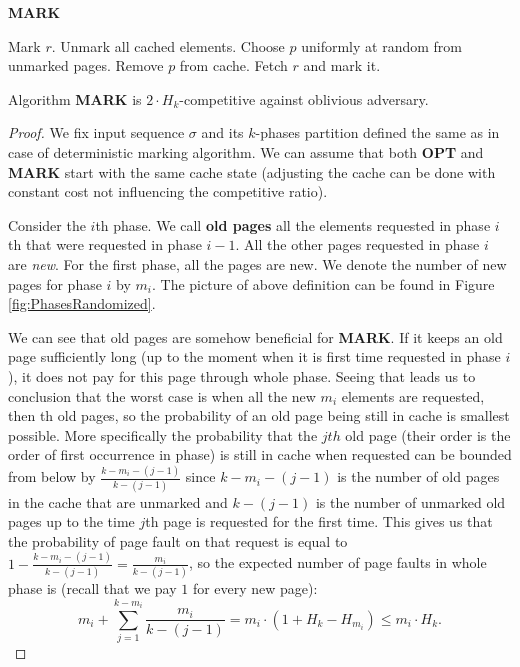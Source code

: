 \begin{algorithm}
\caption{\textbf{MARK}}
\label{alg:MARK}
\begin{algorithmic}[1]
    \State Mark $r$.
  \Else
	\State Unmark all cached elements.
      \EndIf
      \State Choose $p$ uniformly at random from unmarked pages.
      \State Remove $p$ from cache.
    \EndIf
    \State Fetch $r$ and mark it.
  \EndIf
\EndFor
\end{algorithmic}
\end{algorithm}
\begin{theorem}
 Algorithm \textbf{MARK} is $2 \cdot H_k$-competitive against oblivious 
adversary.
\end{theorem}
\begin{proof}
We fix input sequence $\sigma$ and its $k$-phases partition defined the same as 
in case of deterministic marking algorithm. We can assume that both 
\textbf{OPT} and \textbf{MARK} start with the same cache state (adjusting the 
cache can be done with constant cost not influencing the competitive ratio).

Consider the $i$th phase. We call \textbf{old pages} all the elements requested 
in 
phase $i$th that were requested in phase $i-1$. All the other pages requested 
in phase $i$ are \textit{new}. For the first phase, all the pages are new. We 
denote the number of new pages for phase $i$ by $m_i$. The picture of above 
definition can be found in Figure \ref{fig:PhasesRandomized}.


We can see that old pages are somehow beneficial for \textbf{MARK}. If it keeps 
an old page sufficiently long (up to the moment when it is first time requested 
in phase $i$), it does not pay for this page through whole phase. Seeing that 
leads us to conclusion that the worst case is when all the new 
$m_i$ elements are requested, then th old pages, so the probability of an old 
page being still in cache is smallest possible. More specifically the 
probability that the $jth$ old page (their order is the order of first 
occurrence 
in phase) is still in cache when requested can be bounded from below by 
$\frac{k-m_i-(j-1)}{k-(j-1)}$ since $k-m_i-(j-1)$ is the number of old pages in 
the cache that are unmarked and  $k-(j-1)$ is the number of unmarked old pages 
up to the time $j$th page is requested for the first time. This gives us that 
the probability of page fault on that request is equal to $1 - 
\frac{k-m_i-(j-1)}{k-(j-1)} = \frac{m_i}{k-(j-1)}$, so the expected number of 
page faults in whole phase is (recall that we pay $1$ for every new page):
$$ m_i + \sum_{j=1}^{k - m_i}\frac{m_i}{k-(j-1)} = m_i\cdot(1+H_k-H_{m_i}) \leq 
m_i \cdot H_k.$$


\end{proof}
